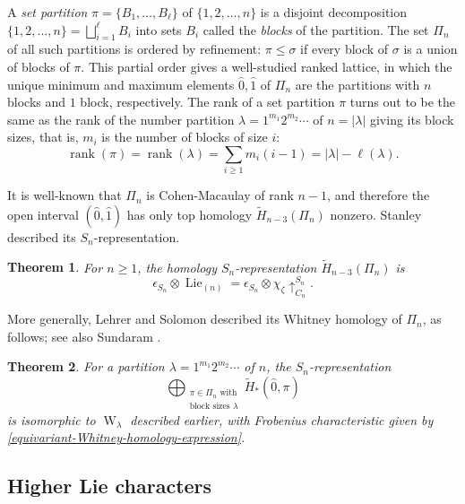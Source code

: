 \documentclass[12pt]{amsart}
\theoremstyle{plain}
\newtheorem{thm}{Theorem}[section]
\theoremstyle{definition}
\begin{document}
A {\it set partition} $\pi=\{B_1,\ldots,B_\ell\}$ of $\{1,2,\ldots,n\}$
is a disjoint decomposition $\{1,2,\ldots,n\}=\bigsqcup_{i=1}^\ell B_i$
into sets $B_i$ called the {\it blocks} of the partition.
The set $\Pi_n$ of all such partitions 
is ordered by refinement: $\pi \leq \sigma$ if every block of
$\sigma$ is a union of blocks of $\pi$.  This partial order
gives a well-studied ranked lattice, in which the
unique minimum and maximum elements $\hat{0},\hat{1}$ of $\Pi_n$
are the partitions with $n$ blocks and $1$ block, respectively.
The rank of a set partition $\pi$ turns out to
be the same as the rank of the 
number partition $\lambda=1^{m_1} 2^{m_2} \cdots$ of $n=|\lambda|$ 
giving its block sizes, that is, $m_i$ is the number
of blocks of size $i$:
\begin{equation}
\label{set-partition-rank-formula}
{{\operatorname{rank}}}(\pi) = {{\operatorname{rank}}}(\lambda) = \sum_{i \geq 1} m_i(i-1) = |\lambda|-\ell(\lambda).
\end{equation}

It is well-known that $\Pi_n$ is Cohen-Macaulay of rank $n-1$, and 
therefore the open interval $(\hat{0},\hat{1})$ has only top homology
$\tilde{H}_{n-3}(\Pi_n) $ nonzero. 
Stanley \cite{Stanley} described its $S_n$-representation.

\begin{thm}{\cite[Thm. 7.3]{Stanley}}
\label{induced-expression}
For $n \geq 1$, the homology $S_n$-representation
$\tilde{H}_{n-3}(\Pi_n)$ is
$$
\epsilon_{S_n} \otimes {{\operatorname{Lie}}}_{(n)}
  = \epsilon_{S_n} \otimes \chi_\zeta \uparrow_{C_n}^{S_n}.
$$
\end{thm}

\noindent
More generally, Lehrer and Solomon
\cite{LehrerSolomon} described its 
Whitney homology of $\Pi_n$, as follows;
see also Sundaram \cite[Theorem 1.8]{Sundaram}.  

\begin{thm}
\label{Lehrer-Solomon-theorem}
For a partition $\lambda=1^{m_1} 2^{m_2} \cdots$ of $n$,
the $S_n$-representation
$$
\bigoplus_{\substack{\pi \in \Pi_n\text{ with}\\\text{block sizes }\lambda}} \tilde{H}_*(\hat{0},\pi)
$$
is isomorphic to ${{\operatorname{W}}}_\lambda$ described earlier, with
Frobenius characteristic given by \eqref{equivariant-Whitney-homology-expression}.
\end{thm}

\subsection{Higher Lie characters}
\label{higher-Lie-section}
\end{document}
